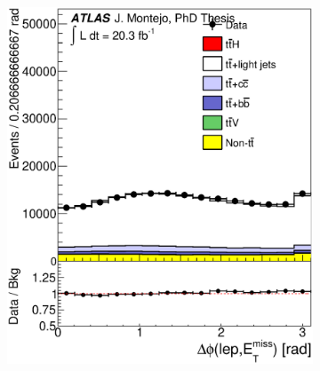 \begin{figure}[tp!]
\begin{subfigure}{0.32\textwidth}
  \caption{} \end{subfigure}
  \\
  \begin{subfigure}{0.32\textwidth}
  \includegraphics[width=\textwidth]{Modeling/Figures/plots_4j2b/deltaPhi_lep_MET_ELEMUON_4jetin2btagin_NOMINAL.eps}     
  \caption{} \end{subfigure}
  \begin{subfigure}{0.32\textwidth}

\end{subfigure}
\end{figure}
